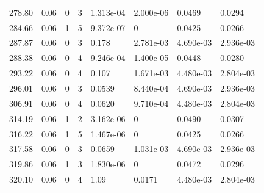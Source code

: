 \documentclass[preview]{standalone}
\begin{document}
{{{\begin{tabular}{L{1.2cm}C{1.2cm} C{0.3cm}C{0.5cm} C{1.4cm}C{1.4cm} C{1.4cm}C{1.4cm}}
  278.80  &  0.06  & 0     &  3 &  1.313e-04  & 2.000e-06  & 0.0469 &  0.0294   \\ 
  284.66  &  0.06  & 1     &  5 &  9.372e-07  & 0  & 0.0425 &  0.0266   \\ 
  287.87  &  0.06  & 0     &  3 &  0.178  & 2.781e-03  & 4.690e-03 &  2.936e-03   \\ 
  288.38  &  0.06  & 0     &  4 &  9.246e-04  & 1.400e-05  & 0.0448 &  0.0280   \\ 
  293.22  &  0.06  & 0     &  4 &  0.107  & 1.671e-03  & 4.480e-03 &  2.804e-03   \\ 
  296.01  &  0.06  & 0     &  3 &  0.0539  & 8.440e-04  & 4.690e-03 &  2.936e-03   \\ 
  306.91  &  0.06  & 0     &  4 &  0.0620  & 9.710e-04  & 4.480e-03 &  2.804e-03   \\ 
  314.19  &  0.06  & 1     &  2 &  3.162e-06  & 0  & 0.0490 &  0.0307   \\ 
  316.22  &  0.06  & 1     &  5 &  1.467e-06  & 0  & 0.0425 &  0.0266   \\ 
  317.58  &  0.06  & 0     &  3 &  0.0659  & 1.031e-03  & 4.690e-03 &  2.936e-03   \\ 
  319.86  &  0.06  & 1     &  3 &  1.830e-06  & 0  & 0.0472 &  0.0296   \\ 
  320.10  &  0.06  & 0     &  4 &  1.09  & 0.0171  & 4.480e-03 &  2.804e-03   \\ 
\hline 
\end{tabular} 

}}}
\end{document}

